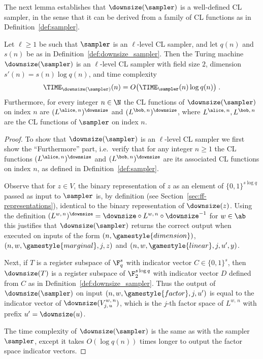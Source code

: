 The next lemma establishes that $\downsize(\sampler)$ is a well-defined CL
sampler, in the sense that it can be derived from a family of CL functions as in
Definition~\ref{def:sampler}.

\begin{lemma}
  \label{lem:downsize_sampler}
  Let $\ell \geq 1$ be such that $\sampler$ is an $\ell$-level CL sampler, and
  let $q(n)$ and $s(n)$ be as in Definition~\ref{def:downsize_sampler}.
  Then the Turing machine $\downsize(\sampler)$ is an $\ell$-level CL sampler
  with field size $2$, dimension $s'(n) = s(n) \log q(n)$, and
  time complexity
  \begin{equation*}
\TIME_{\downsize(\sampler)}(n) = O \bigl( \TIME_\sampler(n) \log q(n) \bigr)\;.
  \end{equation*}
  Furthermore, for every integer $n \in \N$ the CL functions of
  $\downsize(\sampler)$ on index $n$ are $(L^{\alice,\, n})^\downsize$ and
  $(L^{\bob,\, n})^\downsize$, where $L^{\alice,\, n}, L^{\bob,\, n}$ are the CL
  functions of $\sampler$ on index $n$.
\end{lemma}

\begin{proof} 
  To show that $\downsize(\sampler)$ is an $\ell$-level CL sampler we first show
  the ``Furthermore'' part, i.e.\ verify that for any integer $n\geq 1$ the CL
  functions $(L^{\alice,\, n})^\downsize$ and $(L^{\bob,\, n})^\downsize$ are its
  associated CL functions on index $n$, as defined in
  Definition~\ref{def:sampler}.

  Observe that for $z\in V$, the binary representation of $z$ as an element of
  $\{0,1\}^{s\log q}$ passed as input to $\sampler$ is, by definition (see
  Section~\ref{sec:ff-representations}), identical to the binary representation
  of $\downsize(z)$.
  Using the definition $(L^{w,\, n})^\downsize = \downsize \circ L^{w,\, n}
  \circ \downsize^{-1}$ for $w \in \ab$ this justifies that
  $\downsize(\sampler)$ returns the correct output when executed on inputs of
  the form $(n,\gamestyle{dimension})$, $(n,w,\gamestyle{marginal},j,z)$ and
  $(n, w, \gamestyle{linear}, j, u', y)$.

  Next, if $T$ is a register subspace of $\F_q^s$ with indicator vector $C \in
  \{0,1\}^s$, then $\downsize(T)$ is a register subspace of $\F_2^{s\log q}$
  with indicator vector $D$ defined from $C$ as in
  Definition~\ref{def:downsize_sampler}.
  Thus the output of $\downsize(\sampler)$ on input $(n, w, \gamestyle{factor},
  j, u')$ is equal to the indicator vector of $\downsize(V^{w,\, n}_{j,\, u})$,
  which is the $j$-th factor space of $L^{w,\, n}$ with prefix $u' =
  \downsize(u)$.

  The time complexity of $\downsize(\sampler)$ is the same as
  with the sampler $\sampler$, except it takes $O(\log q(n))$ times longer to
  output the factor space indicator vectors.

\end{proof}


 
